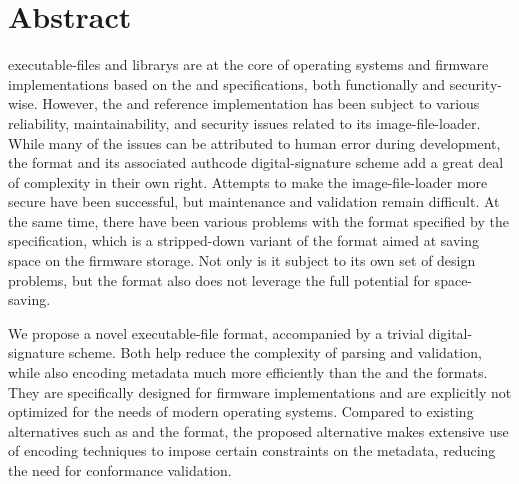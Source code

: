 \cleardoublepage
{}
\chapter*{Abstract}

\saveparinfos
\begin{center}
  \begin{minipage}[t]{0.7\textwidth}
    \useparinfo

    \noindent\Glspl{executable-file} and \glspl{library} are at the core of operating systems and \gls{firmware} implementations based on the  and  specifications, both functionally and security-wise. However, the  and  reference implementation  has been subject to various reliability, maintainability, and security issues related to its  \gls{image-file-loader}. While many of the issues can be attributed to human error during development, the  format and its associated \gls{authcode} \gls{digital-signature} scheme add a great deal of complexity in their own right. Attempts to make the   \gls{image-file-loader} more secure have been successful, but maintenance and validation remain difficult. At the same time, there have been various problems with the  format specified by the  specification, which is a stripped-down variant of the  format aimed at saving space on the \gls{firmware} storage. Not only is it subject to its own set of design problems, but the format also does not leverage the full potential for space-saving.

    We propose a novel \gls{executable-file} format, accompanied by a trivial \gls{digital-signature} scheme. Both help reduce the complexity of parsing and validation, while also encoding metadata much more efficiently than the  and the  formats. They are specifically designed for  \gls{firmware} implementations and are explicitly not optimized for the needs of modern operating systems. Compared to existing alternatives such as  and the  format, the proposed alternative makes extensive use of encoding techniques to impose certain constraints on the metadata, reducing the need for conformance validation.
  \end{minipage}
\end{center}

\vfill
